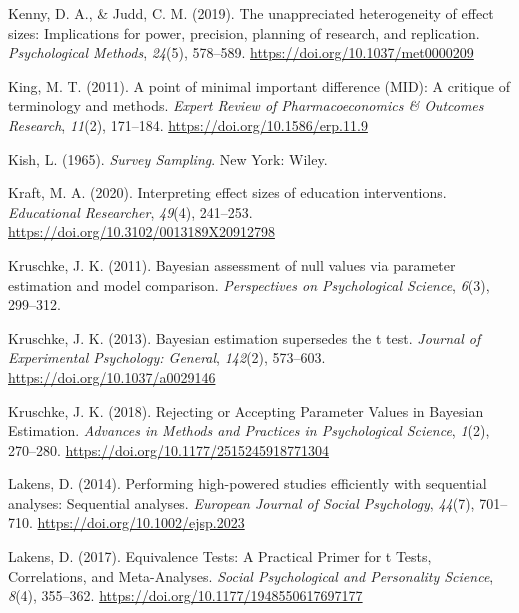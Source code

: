 \documentclass[
  english,
  ,jou, a4paper,floatsintext]{apa6}
\newlength{\cslhangindent}
\newenvironment{cslreferences}%
  {\setlength{\parindent}{0pt}%
  \everypar{\setlength{\hangindent}{\cslhangindent}}\ignorespaces}%
  {\par}
\begin{document}
\begin{cslreferences}
\leavevmode\hypertarget{ref-kenny_unappreciated_2019}{}%
Kenny, D. A., \& Judd, C. M. (2019). The unappreciated heterogeneity of effect sizes: Implications for power, precision, planning of research, and replication. \emph{Psychological Methods}, \emph{24}(5), 578--589. \url{https://doi.org/10.1037/met0000209}

\leavevmode\hypertarget{ref-king_point_2011}{}%
King, M. T. (2011). A point of minimal important difference (MID): A critique of terminology and methods. \emph{Expert Review of Pharmacoeconomics \& Outcomes Research}, \emph{11}(2), 171--184. \url{https://doi.org/10.1586/erp.11.9}

\leavevmode\hypertarget{ref-kish_survey_1965}{}%
Kish, L. (1965). \emph{Survey Sampling}. New York: Wiley.

\leavevmode\hypertarget{ref-kraft_interpreting_2020}{}%
Kraft, M. A. (2020). Interpreting effect sizes of education interventions. \emph{Educational Researcher}, \emph{49}(4), 241--253. \url{https://doi.org/10.3102/0013189X20912798}

\leavevmode\hypertarget{ref-kruschke_bayesian_2011}{}%
Kruschke, J. K. (2011). Bayesian assessment of null values via parameter estimation and model comparison. \emph{Perspectives on Psychological Science}, \emph{6}(3), 299--312.

\leavevmode\hypertarget{ref-kruschke_bayesian_2013}{}%
Kruschke, J. K. (2013). Bayesian estimation supersedes the t test. \emph{Journal of Experimental Psychology: General}, \emph{142}(2), 573--603. \url{https://doi.org/10.1037/a0029146}

\leavevmode\hypertarget{ref-kruschke_rejecting_2018}{}%
Kruschke, J. K. (2018). Rejecting or Accepting Parameter Values in Bayesian Estimation. \emph{Advances in Methods and Practices in Psychological Science}, \emph{1}(2), 270--280. \url{https://doi.org/10.1177/2515245918771304}

\leavevmode\hypertarget{ref-lakens_performing_2014}{}%
Lakens, D. (2014). Performing high-powered studies efficiently with sequential analyses: Sequential analyses. \emph{European Journal of Social Psychology}, \emph{44}(7), 701--710. \url{https://doi.org/10.1002/ejsp.2023}

\leavevmode\hypertarget{ref-lakens_equivalence_2017}{}%
Lakens, D. (2017). Equivalence Tests: A Practical Primer for t Tests, Correlations, and Meta-Analyses. \emph{Social Psychological and Personality Science}, \emph{8}(4), 355--362. \url{https://doi.org/10.1177/1948550617697177}


\end{cslreferences}
\end{document}
